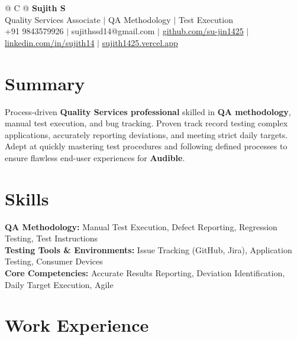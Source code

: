 \documentclass[a4paper,10pt]{article}
\newcommand{\ulink}[2]{\href{#1}{#2}}
\begin{document}
\pagestyle{empty}

\begin{tabularx}{\linewidth}{@{} C @{}}
{\color[HTML]{000000}\fontsize{30}{35}\selectfont\bfseries Sujith S} \\[5pt]
{\fontsize{10.5}{12.5}\selectfont\color[HTML]{3A3A3A}
Quality Services Associate $|$ QA Methodology $|$ Test Execution} \\[6pt]
{\fontsize{9.5}{11.5}\selectfont\textcolor[HTML]{3A3A3A}{+91 9843579926 $|$ sujithssd14@gmail.com $|$ \ulink{https://github.com/su-jin1425}{github.com/su-jin1425} $|$ \ulink{https://linkedin.com/in/sujith14}{linkedin.com/in/sujith14} $|$ \ulink{https://sujith1425.vercel.app}{sujith1425.vercel.app}}}
\end{tabularx}

\section{Summary}
\vspace{2pt}

{\color[HTML]{0A0A0A}\fontsize{11}{14}\selectfont
Process-driven \textbf{Quality Services professional} skilled in \textbf{QA methodology}, manual test execution, and bug tracking. Proven track record testing complex applications, accurately reporting deviations, and meeting strict daily targets. Adept at quickly mastering test procedures and following defined processes to ensure flawless end-user experiences for \textbf{Audible}.}

\section{Skills}
\vspace{2pt}

{\color[HTML]{0A0A0A}\fontsize{11}{14}\selectfont
\textbf{QA Methodology:} Manual Test Execution, Defect Reporting, Regression Testing, Test Instructions \\[2pt]
\textbf{Testing Tools \& Environments:} Issue Tracking (GitHub, Jira), Application Testing, Consumer Devices \\[2pt]
\textbf{Core Competencies:} Accurate Results Reporting, Deviation Identification, Daily Target Execution, Agile}

\section{Work Experience}
\vspace{2pt}
\end{document}
